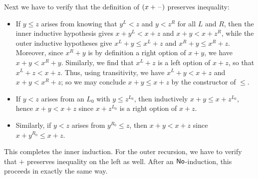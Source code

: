 \begin{eg}
Next we have to verify that the definition of $(x+\mathord{\hspace{1pt}\text{--}\hspace{1pt}})$ preserves inequality:
\begin{itemize}
\item If $y\le z$ arises from knowing that $y^L<z$ and $y<z^R$ for all $L$ and $R$, then the inner inductive hypothesis gives $x+y^L<x+z$ and $x+y < x+z^R$, while the outer inductive hypotheses give $x^L+y \le x^L+z$ and $x^R+ y \le x^R+z$.
  Moreover, since $x^R+y$ is by definition a right option of $x+y$, we have $x+y < x^R+y$.
  Similarly, we find that $x^L+z$ is a left option of $x+z$, so that $x^L+z < x+z$.
  Thus, using transitivity, we have $x^L+y < x+z$ and $x+y < x^R+z$; so we may conclude $x+y \le x+z$ by the constructor of $\le$.
\item If $y<z$ arises from an $L_0$ with $y\le z^{L_0}$, then inductively $x+y \le x+z^{L_0}$, hence $x+y<x+z$ since $x+z^{L_0}$ is a right option of $x+z$.
\item Similarly, if $y<z$ arises from $y^{R_0}\le z$, then $x+y<x+z$ since $x+y^{R_0}\le x+z$.
\end{itemize}
This completes the inner induction.
For the outer recursion, we have to verify that $+$ preserves inequality on the left as well.
After an $\mathsf{No}$-induction, this proceeds in exactly the same way.
\end{eg}

